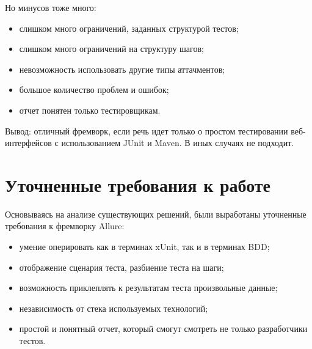 Но минусов тоже много:
\begin{itemize}
\item слишком много ограничений, заданных структурой тестов;
\item слишком много ограничений на структуру шагов;
\item невозможность использовать другие типы аттачментов;
\item большое количество проблем и ошибок;
\item отчет понятен только тестировщикам.
\end{itemize}

Вывод: отличный фремворк, если речь идет только о простом тестировании веб-интерфейсов с использованием JUnit и Maven. В иных случаях не подходит.

\section{Уточненные требования к работе}

Основываясь на анализе существующих решений, были выработаны уточненные требования к фремворку Allure:

\begin{itemize}
\item умение оперировать как в терминах xUnit, так и в терминах BDD;
\item отображение сценария теста, разбиение теста на шаги;
\item возможность приклеплять к результатам теста произвольные данные;
\item независимость от стека используемых технологий;
\item простой и понятный отчет, который смогут смотреть не только разработчики тестов.
\end{itemize}